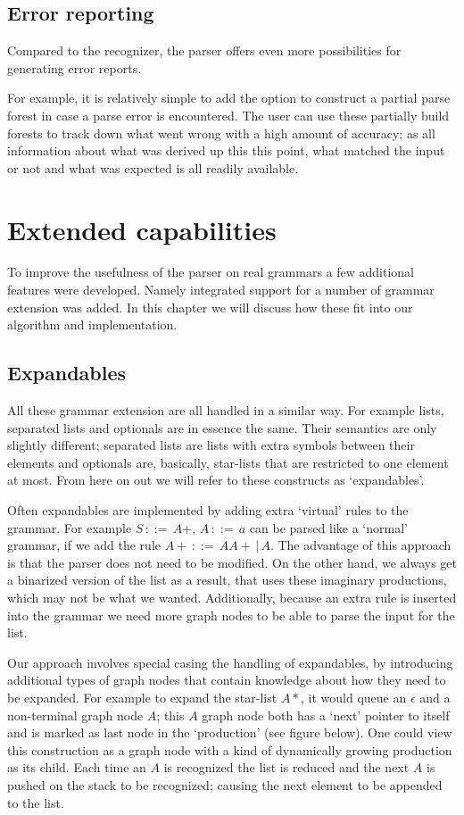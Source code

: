 \documentclass[a4paper,10pt]{article}
\begin{document}
\subsection{Error reporting}

Compared to the recognizer, the parser offers even more possibilities for generating error reports.

For example, it is relatively simple to add the option to construct a partial parse forest in case a parse error is encountered. The user can use these partially build forests to track down what went wrong with a high amount of accuracy; as all information about what was derived up this this point, what matched the input or not and what was expected is all readily available.

\section{Extended capabilities}

To improve the usefulness of the parser on real grammars a few additional features were developed. Namely integrated support for a number of grammar extension was added. In this chapter we will discuss how these fit into our algorithm and implementation.

\subsection{Expandables}

All these grammar extension are all handled in a similar way. For example lists, separated lists and optionals are in essence the same. Their semantics are only slightly different; separated lists are lists with extra symbols between their elements and optionals are, basically, star-lists that are restricted to one element at most. From here on out we will refer to these constructs as `expandables'.

Often expandables are implemented by adding extra `virtual' rules to the grammar. For example $S\,::=\,A+,\,A\,::=\,a$ can be parsed like a `normal' grammar, if we add the rule $A+\,::=\,AA+\,|\,A$. The advantage of this approach is that the parser does not need to be modified. On the other hand, we always get a binarized version of the list as a result, that uses these imaginary productions, which may not be what we wanted. Additionally, because an extra rule is inserted into the grammar we need more graph nodes to be able to parse the input for the list.

Our approach involves special casing the handling of expandables, by introducing additional types of graph nodes that contain knowledge about how they need to be expanded. For example to expand the star-list $A*$, it would queue an $\epsilon$ and a non-terminal graph node $A$; this $A$ graph node both has a `next' pointer to itself and is marked as last node in the `production' (see figure below). One could view this construction as a graph node with a kind of dynamically growing production as its child. Each time an $A$ is recognized the list is reduced and the next $A$ is pushed on the stack to be recognized; causing the next element to be appended to the list.
\end{document}

